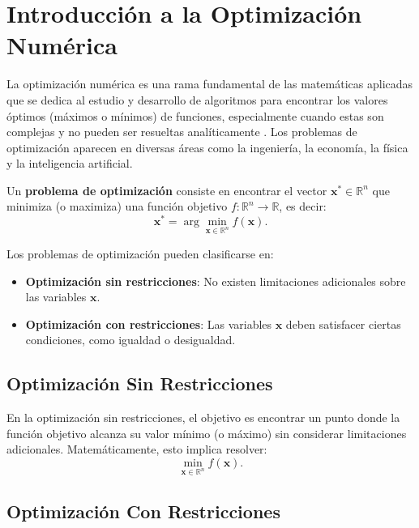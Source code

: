 \section{Introducción a la Optimización Numérica}

La optimización numérica es una rama fundamental de las matemáticas aplicadas que se dedica al estudio y desarrollo de algoritmos para encontrar los valores óptimos (máximos o mínimos) de funciones, especialmente cuando estas son complejas y no pueden ser resueltas analíticamente \cite{nocedal2006numerical}. Los problemas de optimización aparecen en diversas áreas como la ingeniería, la economía, la física y la inteligencia artificial.

\begin{definicion}
\label{def:optimizacion}
Un \textbf{problema de optimización} consiste en encontrar el vector $\mathbf{x}^* \in \mathbb{R}^n$ que minimiza (o maximiza) una función objetivo $f: \mathbb{R}^n \rightarrow \mathbb{R}$, es decir:
\begin{equation}
\mathbf{x}^* = \arg\min_{\mathbf{x} \in \mathbb{R}^n} f(\mathbf{x}).
\end{equation}
\end{definicion}

Los problemas de optimización pueden clasificarse en:

\begin{itemize}
    \item \textbf{Optimización sin restricciones}: No existen limitaciones adicionales sobre las variables $\mathbf{x}$.
    \item \textbf{Optimización con restricciones}: Las variables $\mathbf{x}$ deben satisfacer ciertas condiciones, como igualdad o desigualdad.
\end{itemize}

\subsection{Optimización Sin Restricciones}

En la optimización sin restricciones, el objetivo es encontrar un punto donde la función objetivo alcanza su valor mínimo (o máximo) sin considerar limitaciones adicionales. Matemáticamente, esto implica resolver:
\begin{equation}
\min_{\mathbf{x} \in \mathbb{R}^n} f(\mathbf{x}).
\end{equation}

\subsection{Optimización Con Restricciones}

